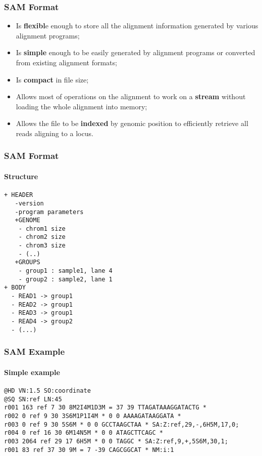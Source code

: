 \documentclass{beamer}
\begin{document}
\begin{frame}[fragile]
\frametitle{SAM Format}
\begin{itemize}
\item Is \textbf{flexibl}e enough to store all the alignment information generated by various alignment programs;
\item Is \textbf{simple} enough to be easily generated by alignment programs or converted from existing alignment formats;
\item Is \textbf{compact} in file size;
\item Allows most of operations on the alignment to work on a \textbf{stream} without loading the whole alignment into memory;
\item Allows the file to be \textbf{indexed} by genomic position to efficiently retrieve all reads aligning to a locus. 
\end{itemize}
\end{frame}



\begin{frame}[fragile]
\frametitle{SAM Format}
\framesubtitle{Structure}
\begin{verbatim}
+ HEADER
   -version
   -program parameters
   +GENOME
   	- chrom1 size
   	- chrom2 size
   	- chrom3 size
   	- (..)
   +GROUPS
   	- group1 : sample1, lane 4
   	- group2 : sample2, lane 1
+ BODY
  - READ1 -> group1
  - READ2 -> group1
  - READ3 -> group1
  - READ4 -> group2
  - (...)
\end{verbatim}
\end{frame}


\begin{frame}[fragile]
\frametitle{SAM Example}
\framesubtitle{Simple example}
\begin{framed}\tiny
\begin{verbatim}
@HD VN:1.5 SO:coordinate
@SQ SN:ref LN:45
r001 163 ref 7 30 8M2I4M1D3M = 37 39 TTAGATAAAGGATACTG *
r002 0 ref 9 30 3S6M1P1I4M * 0 0 AAAAGATAAGGATA *
r003 0 ref 9 30 5S6M * 0 0 GCCTAAGCTAA * SA:Z:ref,29,-,6H5M,17,0;
r004 0 ref 16 30 6M14N5M * 0 0 ATAGCTTCAGC *
r003 2064 ref 29 17 6H5M * 0 0 TAGGC * SA:Z:ref,9,+,5S6M,30,1;
r001 83 ref 37 30 9M = 7 -39 CAGCGGCAT * NM:i:1
\end{verbatim}
\end{framed}
\end{frame}


\end{document}
